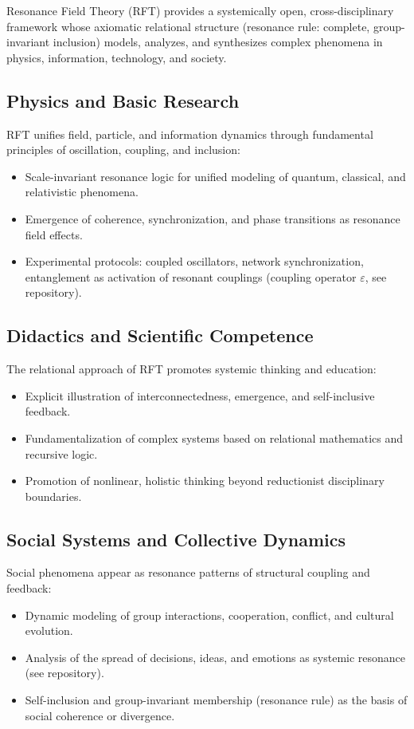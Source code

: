 \documentclass[12pt]{iopart}
\begin{document}
Resonance Field Theory (RFT) provides a systemically open, cross-disciplinary framework whose axiomatic relational structure (resonance rule: complete, group-invariant inclusion) models, analyzes, and synthesizes complex phenomena in physics, information, technology, and society.

\subsection{Physics and Basic Research}

RFT unifies field, particle, and information dynamics through fundamental principles of oscillation, coupling, and inclusion:
\begin{itemize}
	\item Scale-invariant resonance logic for unified modeling of quantum, classical, and relativistic phenomena.
	\item Emergence of coherence, synchronization, and phase transitions as resonance field effects.
	\item Experimental protocols: coupled oscillators, network synchronization, entanglement as activation of resonant couplings (coupling operator $\varepsilon$, see repository).
\end{itemize}

\subsection{Didactics and Scientific Competence}

The relational approach of RFT promotes systemic thinking and education:
\begin{itemize}
	\item Explicit illustration of interconnectedness, emergence, and self-inclusive feedback.
	\item Fundamentalization of complex systems based on relational mathematics and recursive logic.
	\item Promotion of nonlinear, holistic thinking beyond reductionist disciplinary boundaries.
\end{itemize}

\subsection{Social Systems and Collective Dynamics}

Social phenomena appear as resonance patterns of structural coupling and feedback:
\begin{itemize}
	\item Dynamic modeling of group interactions, cooperation, conflict, and cultural evolution.
	\item Analysis of the spread of decisions, ideas, and emotions as systemic resonance (see repository).
	\item Self-inclusion and group-invariant membership (resonance rule) as the basis of social coherence or divergence.
\end{itemize}
\end{document}
